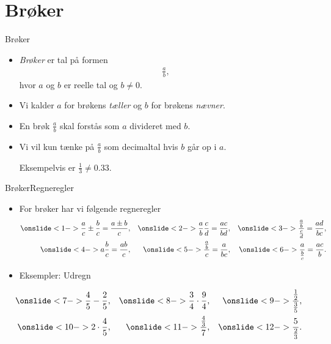 \section{Brøker}
\begin{frame}{Brøker}
\begin{itemize}
		\setlength\itemsep{1em}
	\item<1-> \emph{Brøker} er tal på formen
	\begin{align*}
	\frac{a}{b},
	\end{align*}
	hvor $a$ og $b$ er reelle tal og $b\neq 0$.
	\item<2->  Vi kalder $a$ for brøkens \emph{tæller} og $b$ for brøkens \emph{nævner}.
	\item<3-> En brøk $\frac{a}{b}$ skal forstås som $a$ divideret med $b$.
	\item<4-> Vi vil kun tænke på $\frac{a}{b}$ som decimaltal hvis $b$ går op i $a$.
	
	Eksempelvis er $\frac{1}{3}\neq 0.33$.
\end{itemize}

\end{frame}
\begin{frame}{Brøker}{Regneregler}
\begin{itemize}
		\setlength\itemsep{1em}
	\item<1-> For brøker har vi følgende regneregler
	\begin{align*}
	\onslide<1->{\frac{a}{c}\pm\frac{b}{c}=\frac{a\pm b}{c},}&&\onslide<2->{\frac{a}{b}\frac{c}{d}=\frac{ac}{bd},}&&\onslide<3->{\frac{\frac{a}{b}}{\frac{c}{d}}=\frac{ad}{bc},}\\
	\onslide<4->{a\frac{b}{c}=\frac{ab}{c},}&& \onslide<5->{\frac{\frac{a}{b}}{c}=\frac{a}{bc},}&&\onslide<6->{\frac{a}{\frac{b}{c}}=\frac{ac}{b}.}
	\end{align*}
	\item<7-> Eksempler: Udregn
\end{itemize}
	\begin{align*}
\onslide<7->{\frac{4}{5}-\frac{2}{5},}&&\onslide<8->{\frac{3}{4}\cdot\frac{9}{4},}&&\onslide<9->{\frac{\frac{1}{2}}{\frac{3}{5}},}\\
\onslide<10->{2\cdot\frac{4}{5},}&& \onslide<11->{\frac{\frac{4}{3}}{7},}&&\onslide<12->{\frac{5}{\frac{2}{3}}.}
\end{align*}
\end{frame}

